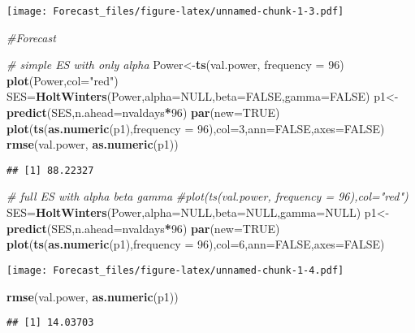 \documentclass[]{article}
\newenvironment{Shaded}{\begin{snugshade}}{\end{snugshade}}
\newcommand{\CommentTok}[1]{\textcolor[rgb]{0.56,0.35,0.01}{\textit{#1}}}
\newcommand{\DataTypeTok}[1]{\textcolor[rgb]{0.13,0.29,0.53}{#1}}
\newcommand{\DecValTok}[1]{\textcolor[rgb]{0.00,0.00,0.81}{#1}}
\newcommand{\KeywordTok}[1]{\textcolor[rgb]{0.13,0.29,0.53}{\textbf{#1}}}
\newcommand{\NormalTok}[1]{#1}
\newcommand{\OperatorTok}[1]{\textcolor[rgb]{0.81,0.36,0.00}{\textbf{#1}}}
\newcommand{\OtherTok}[1]{\textcolor[rgb]{0.56,0.35,0.01}{#1}}
\newcommand{\StringTok}[1]{\textcolor[rgb]{0.31,0.60,0.02}{#1}}
\begin{document}
\texttt{[image: Forecast\_files/figure-latex/unnamed-chunk-1-3.pdf]}

\begin{Shaded}
\begin{Highlighting}[]
\CommentTok{#Forecast}

\CommentTok{# simple ES with only alpha}
\NormalTok{Power<-}\KeywordTok{ts}\NormalTok{(val.power, }\DataTypeTok{frequency =} \DecValTok{96}\NormalTok{)}
\KeywordTok{plot}\NormalTok{(Power,}\DataTypeTok{col=}\StringTok{"red"}\NormalTok{)}
\NormalTok{SES=}\KeywordTok{HoltWinters}\NormalTok{(Power,}\DataTypeTok{alpha=}\OtherTok{NULL}\NormalTok{,}\DataTypeTok{beta=}\OtherTok{FALSE}\NormalTok{,}\DataTypeTok{gamma=}\OtherTok{FALSE}\NormalTok{)}
\NormalTok{p1<-}\KeywordTok{predict}\NormalTok{(SES,}\DataTypeTok{n.ahead=}\NormalTok{nvaldays}\OperatorTok{*}\DecValTok{96}\NormalTok{)}
\KeywordTok{par}\NormalTok{(}\DataTypeTok{new=}\OtherTok{TRUE}\NormalTok{)}
\KeywordTok{plot}\NormalTok{(}\KeywordTok{ts}\NormalTok{(}\KeywordTok{as.numeric}\NormalTok{(p1),}\DataTypeTok{frequency =} \DecValTok{96}\NormalTok{),}\DataTypeTok{col=}\DecValTok{3}\NormalTok{,}\DataTypeTok{ann=}\OtherTok{FALSE}\NormalTok{,}\DataTypeTok{axes=}\OtherTok{FALSE}\NormalTok{)}
\KeywordTok{rmse}\NormalTok{(val.power, }\KeywordTok{as.numeric}\NormalTok{(p1))}
\end{Highlighting}
\end{Shaded}

\begin{verbatim}
## [1] 88.22327
\end{verbatim}

\begin{Shaded}
\begin{Highlighting}[]
\CommentTok{# full ES with alpha beta gamma}
\CommentTok{#plot(ts(val.power, frequency = 96),col="red")}
\NormalTok{SES=}\KeywordTok{HoltWinters}\NormalTok{(Power,}\DataTypeTok{alpha=}\OtherTok{NULL}\NormalTok{,}\DataTypeTok{beta=}\OtherTok{NULL}\NormalTok{,}\DataTypeTok{gamma=}\OtherTok{NULL}\NormalTok{)}
\NormalTok{p1<-}\KeywordTok{predict}\NormalTok{(SES,}\DataTypeTok{n.ahead=}\NormalTok{nvaldays}\OperatorTok{*}\DecValTok{96}\NormalTok{)}
\KeywordTok{par}\NormalTok{(}\DataTypeTok{new=}\OtherTok{TRUE}\NormalTok{)}
\KeywordTok{plot}\NormalTok{(}\KeywordTok{ts}\NormalTok{(}\KeywordTok{as.numeric}\NormalTok{(p1),}\DataTypeTok{frequency =} \DecValTok{96}\NormalTok{),}\DataTypeTok{col=}\DecValTok{6}\NormalTok{,}\DataTypeTok{ann=}\OtherTok{FALSE}\NormalTok{,}\DataTypeTok{axes=}\OtherTok{FALSE}\NormalTok{)}
\end{Highlighting}
\end{Shaded}

\texttt{[image: Forecast\_files/figure-latex/unnamed-chunk-1-4.pdf]}

\begin{Shaded}
\begin{Highlighting}[]
\KeywordTok{rmse}\NormalTok{(val.power, }\KeywordTok{as.numeric}\NormalTok{(p1))}
\end{Highlighting}
\end{Shaded}

\begin{verbatim}
## [1] 14.03703
\end{verbatim}
\end{document}
